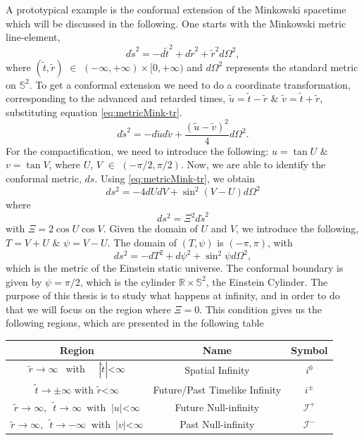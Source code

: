 A prototypical example is the conformal extension of the Minkowski spacetime which will be discussed in the following.  One starts with the Minkowski metric line-element,
\begin{equation}\label{eq:metricMink-tr}
	d \tilde{s}^2=-d \tilde{t}^2+d \tilde{r}^2+\tilde{r}^2 d
        \Omega^2,
\end{equation}
where $(\tilde{t}, \tilde{r})$ $\in$ $(-\infty,+\infty) \times[0,+\infty)$ and $d \Omega^2$ represents the standard metric on $\mathbb{S}^2$. To get a conformal extension we need to do a coordinate transformation, corresponding to the advanced and retarded  times, $\tilde{u}=\tilde{t}-\tilde{r}$ $\&$ $\tilde{v}=\tilde{t}+\tilde{r}$,  substituting equation \eqref{eq:metricMink-tr}.
\begin{equation}\label{eq:metricMink-tr1}
	d \tilde{s}^2=-d \tilde{u} d \tilde{v}+\frac{(\tilde{u}-\tilde{v})^2}{4} d \Omega^2.
\end{equation}
For the compactification, we need to introduce the following: $u = \tan U$ $\&$ $v = \tan V$, where $U$, $V$ $\in$ $(- \pi/2, \pi/2)$. Now, we are able to identify the conformal metric,
$ds$. Using \eqref{eq:metricMink-tr}, we obtain
$$d s^2=-4 d U d V+\sin ^2(V-U) d \Omega^2$$ where
$$d s^2=\Xi^2 d \tilde{s}^2$$
with $\Xi=2 \cos U \cos V$. Given the
domain of $U$ and $V$, we introduce the following, $T=V+U$ $\&$ $\psi=V-U$. The domain of $(T, \psi)$ is $(-\pi, \pi)$, with
\begin{equation}\label{eq:metricMink-cf}
	d s^2=-d T^2+d \psi^2+\sin ^2 \psi d \Omega^2,
\end{equation}
which is the metric of the Einstein static universe. The conformal boundary is given by $\psi = \pi/2$, which is the cylinder $\mathbb{R} \times \mathbb{S}^2$, the Einstein Cylinder. The purpose of this thesis is  to study what happens at infinity, and in order to do that we will focus on the region where $\Xi = 0$. This condition gives us the following regions, which are presented in the following table
\begin{center}
    \begin{tabular}{ |c|c|c| }
      \hline
      Region & Name & Symbol \\
     \hline
     $\tilde{r} \rightarrow \infty \enspace \;  \text{with} \; \;\;\;\;
     |\tilde{t}| $<$ \infty$ & Spatial Infinity & $i^{0}$ \\
     \hline 
     $\tilde{t} \rightarrow \pm \infty$  \;\; with \;\; $\tilde{r}$<$\infty$
     \enspace & Future/Past Timelike Infinity & $i^{\pm}$ \\
     \hline
     $\tilde{r} \rightarrow \infty, \enspace \tilde{t} \rightarrow \infty \enspace
     \text{with} \;\; |u|$<$\infty$ &  Future Null-infinity & $\mathscr{I}^+$ \\ 
     \hline
     $\tilde{r} \rightarrow\infty, \enspace \tilde{t} \rightarrow-\infty \;\;
     \text{with} \enspace |v|$<$\infty$ & Past Null-infinity & $\mathscr{I}^-$ \\
     \hline
    \end{tabular}
    \end{center}
